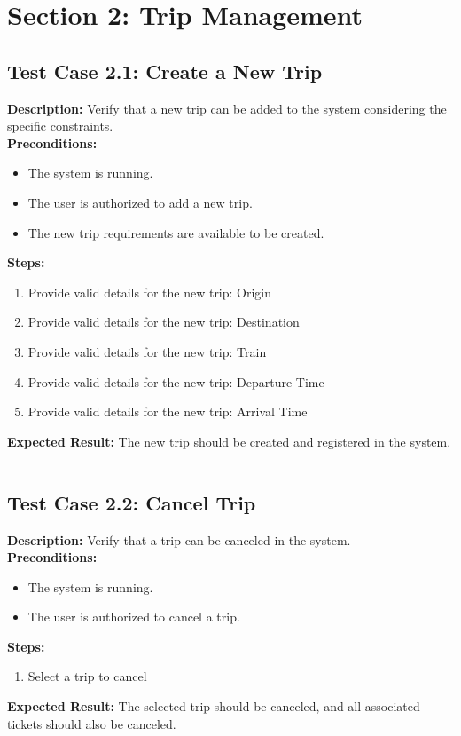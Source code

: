 \documentclass{article}
\begin{document}
\pagebreak

\section{Section 2: Trip Management}
\bigskip
\bigskip
\subsection{Test Case 2.1: Create a New Trip}

\textbf{Description:} Verify that a new trip can be added to the system considering the specific constraints.\\
\textbf{Preconditions:}
\begin{itemize}
  \item The system is running.
  \item The user is authorized to add a new trip.
  \item The new trip requirements are available to be created.
\end{itemize}
\textbf{Steps:}
\begin{enumerate}
  \item Provide valid details for the new trip: Origin
  \item Provide valid details for the new trip: Destination
  \item Provide valid details for the new trip: Train
  \item Provide valid details for the new trip: Departure Time
  \item Provide valid details for the new trip: Arrival Time
\end{enumerate}
\textbf{Expected Result:} The new trip should be created and registered in the system.

\bigskip
\hrule
\bigskip

\subsection{Test Case 2.2: Cancel Trip}

\textbf{Description:} Verify that a trip can be canceled in the system.\\
\textbf{Preconditions:}
\begin{itemize}
  \item The system is running.
  \item The user is authorized to cancel a trip.
\end{itemize}
\textbf{Steps:}
\begin{enumerate}
  \item Select a trip to cancel
\end{enumerate}
\textbf{Expected Result:} The selected trip should be canceled, and all associated tickets should also be canceled.
\end{document}
